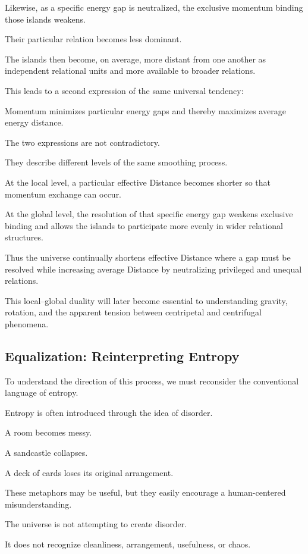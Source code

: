Likewise, as a specific energy gap is neutralized, the exclusive momentum binding those islands weakens.

Their particular relation becomes less dominant.

The islands then become, on average, more distant from one another as independent relational units and more available to broader relations.

This leads to a second expression of the same universal tendency:

Momentum minimizes particular energy gaps and thereby maximizes average energy distance.

The two expressions are not contradictory.

They describe different levels of the same smoothing process.

At the local level, a particular effective Distance becomes shorter so that momentum exchange can occur.

At the global level, the resolution of that specific energy gap weakens exclusive binding and allows the islands to participate more evenly in wider relational structures.

Thus the universe continually shortens effective Distance where a gap must be resolved while increasing average Distance by neutralizing privileged and unequal relations.

This local–global duality will later become essential to understanding gravity, rotation, and the apparent tension between centripetal and centrifugal phenomena.

\subsection*{\textbf{Equalization: Reinterpreting Entropy}}

To understand the direction of this process, we must reconsider the conventional language of entropy.

Entropy is often introduced through the idea of disorder.

A room becomes messy.

A sandcastle collapses.

A deck of cards loses its original arrangement.

These metaphors may be useful, but they easily encourage a human-centered misunderstanding.

The universe is not attempting to create disorder.

It does not recognize cleanliness, arrangement, usefulness, or chaos.

